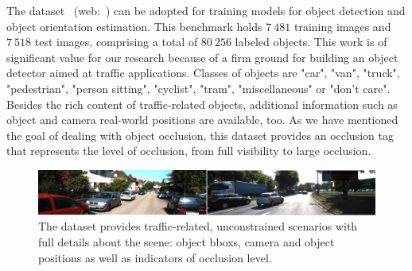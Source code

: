The  dataset~\cite{Geiger2012CVPR} (web:~\cite{kittiobjectdetectiondataset}) can be adopted for training models for object detection and object orientation estimation. This benchmark holds $7\ 481$ training images and $7\ 518$ test images, comprising a total of $80\ 256$ labeled objects. This work is of significant value for our research because of a firm ground for building an object detector aimed at traffic applications. Classes of objects are "car", "van", "truck", "pedestrian", "person sitting", "cyclist", "tram", "miscellaneous" or "don't care". Besides the rich content of traffic-related objects, additional information such as object and camera real-world positions are available, too. As we have mentioned the goal of dealing with object occlusion, this dataset provides an occlusion tag that represents the level of occlusion, from full visibility to large occlusion.

\begin{figure}[t]
    \centerline{\includegraphics[width=0.9\linewidth]{figures/datasets/kitti_detection_sample.pdf}}
    \caption[ dataset]{The  dataset provides traffic-related, unconstrained scenarios with full details about the scene: object \glspl{bbox}, camera and object positions as well as indicators of occlusion level. }
    \label{fig:DatasetKITTIDetection}
\end{figure}
